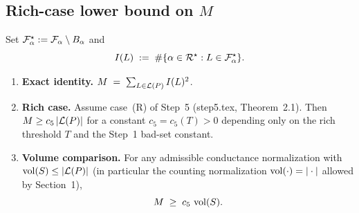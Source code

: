 \subsection{Rich-case lower bound on $M$}\label{sec:gap-second-moment}

\begin{lemma}\label{lem:gap-G5}
Set $\mathcal{F}_{\alpha}^\star := \mathcal{F}_{\alpha}\setminus B_\alpha$ and
\[
I(L)\;:=\;\#\{\alpha\in\mathcal{R}^\star : L\in\mathcal{F}_{\alpha}^\star\}.
\]
\begin{enumerate}[label=(\roman*),nosep]
  \item \textbf{Exact identity.} $M \;=\; \sum_{L\in\mathcal{L}(P)} I(L)^2$.
  \item \textbf{Rich case.} Assume case~(R) of Step~5
    (step5.tex, Theorem~2.1). Then $M \ge c_5\,|\mathcal{L}(P)|$
    for a constant $c_5=c_5(T)>0$ depending only on the rich threshold
    $T$ and the Step~1 bad-set constant.
  \item \textbf{Volume comparison.} For any admissible conductance
    normalization with $\operatorname{vol}(S)\le|\mathcal{L}(P)|$ (in particular the counting
    normalization $\operatorname{vol}(\cdot)=|\cdot|$ allowed by Section~1),
    \[
    M \;\ge\; c_5\,\operatorname{vol}(S).
    \]
\end{enumerate}
\end{lemma}

